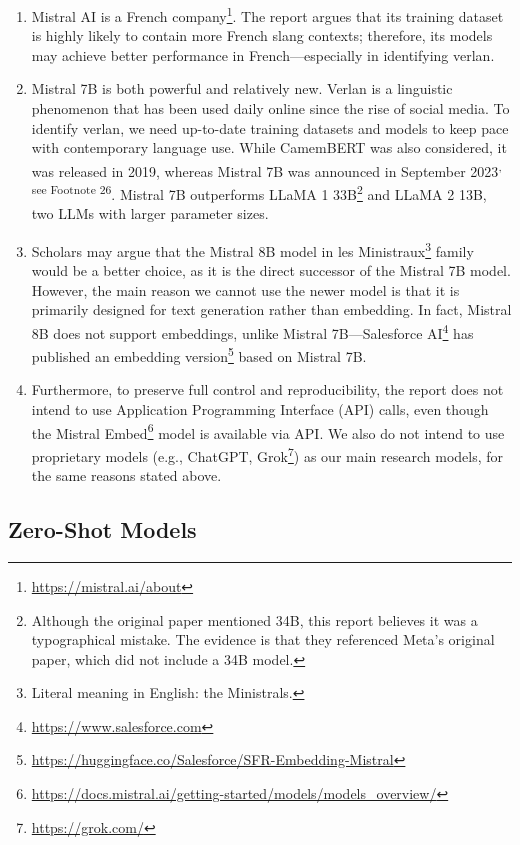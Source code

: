 \documentclass[12pt]{article}
\begin{document}
\begin{enumerate}
\item Mistral AI is a French company\footnote{\url{https://mistral.ai/about}}. The report argues that its training dataset is highly likely to contain more French slang contexts; therefore, its models may achieve better performance in French\;---\;especially in identifying verlan.

\item Mistral 7B is both powerful and relatively new. Verlan is a linguistic phenomenon that has been used daily online since the rise of social media. To identify verlan, we need up-to-date training datasets and models to keep pace with contemporary language use. While CamemBERT was also considered, it was released in 2019, whereas Mistral 7B was announced in September 2023\textsuperscript{, see Footnote 26}\cite{martin2019camembert}. Mistral 7B outperforms LLaMA 1 33B\footnote{Although the original paper mentioned 34B, this report believes it was a typographical mistake. The evidence is that they referenced Meta's original paper, which did not include a 34B model.} and LLaMA 2 13B, two LLMs with larger parameter sizes\cite{touvron2023llama,touvron2023llama2}. 

\item Scholars may argue that the Mistral 8B model in les Ministraux\footnote{Literal meaning in English: the Ministrals.} family would be a better choice, as it is the direct successor of the Mistral 7B model. However, the main reason we cannot use the newer model is that it is primarily designed for text generation rather than embedding. In fact, Mistral 8B does not support embeddings, unlike Mistral 7B\;---\;Salesforce AI\footnote{\url{https://www.salesforce.com}} has published an embedding version\footnote{\url{https://huggingface.co/Salesforce/SFR-Embedding-Mistral}} based on Mistral 7B. 

\item Furthermore, to preserve full control and reproducibility, the report does not intend to use Application Programming Interface (API) calls, even though the Mistral Embed\footnote{\url{https://docs.mistral.ai/getting-started/models/models_overview/}} model is available via API. We also do not intend to use proprietary models (e.g., ChatGPT, Grok\footnote{\url{https://grok.com/}}) as our main research models, for the same reasons stated above.
\end{enumerate}

\subsection{Zero-Shot Models}
\end{document}

